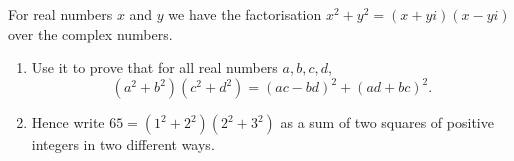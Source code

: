 For real numbers $x$ and $y$ we have the factorisation $x^2+y^2=(x+yi)(x-yi)$ over the complex numbers.
\begin{enumerate}
\item[(a)] Use it to prove that for all real numbers $a,b,c,d$,
\[\left(a^2+b^2\right)\left(c^2+d^2\right)=(ac-bd)^2+(ad+bc)^2.\]
\item[(b)] Hence write $65=\left(1^2+2^2\right)\left(2^2+3^2\right)$ as a sum of two squares of positive integers in two different ways.
\end{enumerate}
